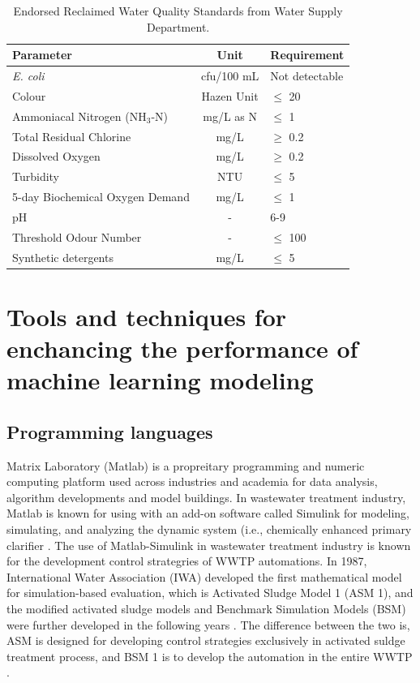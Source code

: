 \begin{table}[!ht]
    \centering
    \caption{\label{tab:reclaimed-standard}Endorsed Reclaimed Water Quality Standards from Water Supply Department.}
    \begin{NiceTabular}{lcl}
        \toprule
        Parameter & Unit & Requirement  \\
        \midrule
        \textit{E. coli} & cfu/100 mL & Not detectable \\ 
        Colour & Hazen Unit & $\le$ 20 \\ 
        Ammoniacal Nitrogen (NH$_3$-N) & mg/L as N & $\le$ 1 \\ 
        Total Residual Chlorine & mg/L & $\ge$ 0.2 \\ 
        Dissolved Oxygen & mg/L & $\ge$ 0.2 \\ 
        Turbidity & NTU & $\le$ 5 \\ 
        5-day Biochemical Oxygen Demand & mg/L & $\le$ 1 \\ 
        pH & - & 6-9 \\ 
        Threshold Odour Number & - & $\le$ 100 \\ 
        Synthetic detergents & mg/L & $\le$ 5 \\
        \bottomrule
    \end{NiceTabular}
\end{table}

\section{Tools and techniques for enchancing the performance of machine learning modeling}
\subsection{Programming languages}

Matrix Laboratory (Matlab) is a propreitary programming and numeric computing platform used across industries and academia for data analysis, algorithm developments and model buildings. In wastewater treatment industry, Matlab is known for using with an add-on software called Simulink for modeling, simulating, and analyzing the dynamic system (i.e., chemically enhanced primary clarifier \citep{bachisModellingCharacterizationPrimary2015}. The use of Matlab-Simulink in wastewater treatment industry is known for the development control strategries of WWTP automations. In 1987, International Water Association (IWA) developed the first mathematical model for simulation-based evaluation, which is Activated Sludge Model 1 (ASM 1), and the modified activated sludge models and Benchmark Simulation Models (BSM) were further developed in the following years \citep{talibModelingControlWastewater2011}. The difference between the two is, ASM is designed for developing control strategies exclusively in activated suldge treatment process, and BSM 1 is to develop the automation in the entire WWTP \citep{ballhysaWastewaterTreatmentPlant2020}.

